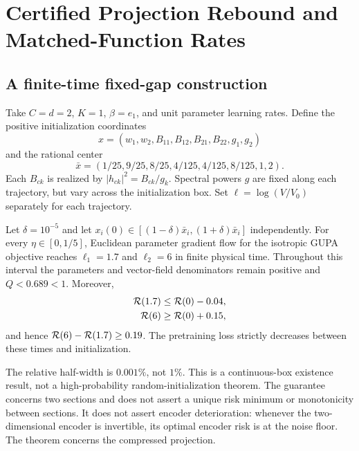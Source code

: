 \section{Certified Projection Rebound and Matched-Function Rates}
\label{sec:theory}
\subsection{A finite-time fixed-gap construction}
Take $C=d=2$, $K=1$, $\beta=e_1$, and unit parameter learning rates. Define the positive initialization coordinates
\begin{equation}
x=(w_1,w_2,B_{11},B_{12},B_{21},B_{22},g_1,g_2)
\end{equation}
and the rational center
\begin{equation}
\bar x=(1/25,9/25,8/25,4/125,4/125,8/125,1,2).
\end{equation}
Each $B_{ck}$ is realized by $|h_{ck}|^2=B_{ck}/g_k$. Spectral powers $g$ are fixed along each trajectory, but vary across the initialization box. Set $\ell=\log(V/V_0)$ separately for each trajectory.

\begin{theorem}
\label{thm:gap}
Let $\delta=10^{-5}$ and let $x_i(0)\in[(1-\delta)\bar x_i,(1+\delta)\bar x_i]$ independently. For every $\eta\in[0,1/5]$, Euclidean parameter gradient flow for the isotropic GUPA objective reaches $\ell_1=1.7$ and $\ell_2=6$ in finite physical time. Throughout this interval the parameters and vector-field denominators remain positive and $Q<0.689<1$. Moreover,
\begin{align}
\mathcal R(1.7)&\leq\mathcal R(0)-0.04,\\
\mathcal R(6)&\geq\mathcal R(0)+0.15,
\end{align}
and hence $\mathcal R(6)-\mathcal R(1.7)\geq0.19$. The pretraining loss strictly decreases between these times and initialization.
\end{theorem}

The relative half-width is $0.001\%$, not $1\%$. This is a continuous-box existence result, not a high-probability random-initialization theorem. The guarantee concerns two sections and does not assert a unique risk minimum or monotonicity between sections. It does not assert encoder deterioration: whenever the two-dimensional encoder is invertible, its optimal encoder risk is at the noise floor. The theorem concerns the compressed projection.

